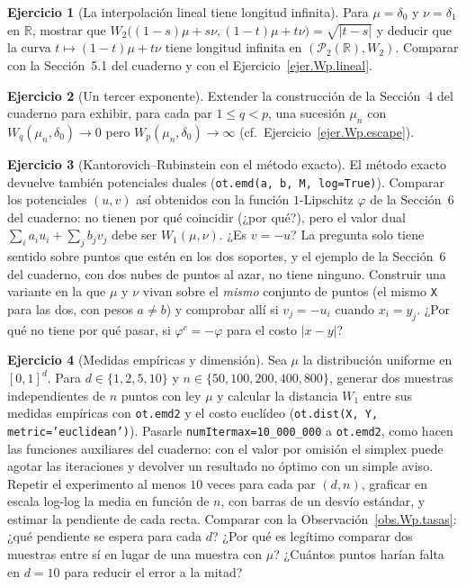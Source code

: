 \documentclass[12pt, a4paper]{amsbook}
\newcommand{\R}{{\mathbb R}}
\theoremstyle{remark}
\theoremstyle{definition}
\newtheorem{ejercicio}{Ejercicio}[chapter]
\numberwithin{section}{chapter}
\numberwithin{subsection}{section}
\numberwithin{equation}{section}
\numberwithin{figure}{chapter}
\begin{document}
\begin{ejercicio}[La interpolación lineal tiene longitud infinita]\label{ejc.Wp.lineal}
Para $\mu=\delta_0$ y $\nu=\delta_1$ en $\R$, mostrar que
$W_2\bigl((1-s)\mu+s\nu,(1-t)\mu+t\nu\bigr)=\sqrt{|t-s|}$ y deducir que la
curva $t\mapsto(1-t)\mu+t\nu$ tiene longitud infinita en $(\mathcal P_2(\R),W_2)$.
Comparar con la Sección~5.1 del cuaderno y con el
Ejercicio~\ref{ejer.Wp.lineal}.
\end{ejercicio}

\begin{ejercicio}[Un tercer exponente]\label{ejc.Wp.exponente}
Extender la construcción de la Sección~4 del cuaderno para exhibir, para cada
par $1\le q<p$, una sucesión $\mu_n$ con $W_q(\mu_n,\delta_0)\to0$ pero
$W_p(\mu_n,\delta_0)\to\infty$ (cf.\ Ejercicio~\ref{ejer.Wp.escape}).
\end{ejercicio}

\begin{ejercicio}[Kantorovich--Rubinstein con el método exacto]\label{ejc.Wp.KR}
El método exacto devuelve también potenciales duales
(\texttt{ot.emd(a, b, M, log=True)}). Comparar los potenciales $(u,v)$ así
obtenidos con la función $1$-Lipschitz $\varphi$ de la Sección~6 del cuaderno:
no tienen por qué coincidir (¿por qué?), pero el valor dual
$\sum_ia_iu_i+\sum_jb_jv_j$ debe ser $W_1(\mu,\nu)$. ¿Es $v=-u$? La pregunta
solo tiene sentido sobre puntos que estén en los dos soportes, y el ejemplo
de la Sección~6 del cuaderno, con dos nubes de puntos al azar, no tiene
ninguno. Construir una variante en la que $\mu$ y $\nu$ vivan sobre el
\emph{mismo} conjunto de puntos (el mismo \texttt{X} para las dos, con pesos
$a\neq b$) y comprobar allí si $v_j=-u_i$ cuando $x_i=y_j$. ¿Por qué no tiene
por qué pasar, si $\varphi^c=-\varphi$ para el costo $|x-y|$?
\end{ejercicio}

\begin{ejercicio}[Medidas empíricas y dimensión]\label{ejc.Wp.muestras}
Sea $\mu$ la distribución uniforme en $[0,1]^d$. Para $d\in\{1,2,5,10\}$ y
$n\in\{50,100,200,400,800\}$, generar dos muestras independientes de $n$
puntos con ley $\mu$ y calcular la distancia $W_1$ entre sus medidas
empíricas con \texttt{ot.emd2} y el costo euclídeo
(\texttt{ot.dist(X, Y, metric='euclidean')}). Pasarle
\texttt{numItermax=10\_000\_000} a \texttt{ot.emd2}, como hacen las funciones
auxiliares del cuaderno: con el valor por omisión el simplex puede agotar las
iteraciones y devolver un resultado no óptimo con un simple aviso. Repetir el experimento al
menos $10$ veces para cada par $(d,n)$, graficar en escala log-log la media
en función de $n$, con barras de un desvío estándar, y estimar la pendiente
de cada recta. Comparar con la Observación~\ref{obs.Wp.tasas}: ¿qué
pendiente se espera para cada $d$? ¿Por qué es legítimo comparar dos
muestras entre sí en lugar de una muestra con $\mu$? ¿Cuántos puntos harían
falta en $d=10$ para reducir el error a la mitad?
\end{ejercicio}
\end{document}
